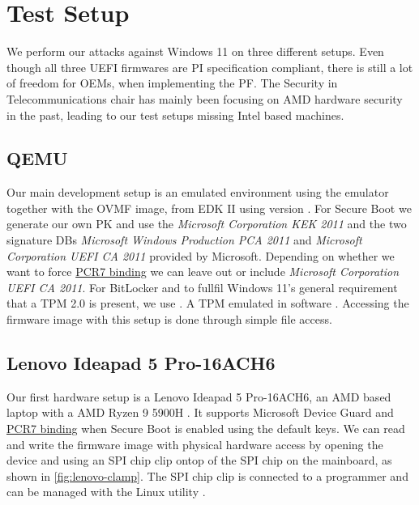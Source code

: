 
\chapter{Test Setup}
\label{sec:test-setup}

We perform our attacks against Windows 11 on three different setups.
Even though all three \ac{UEFI} firmwares are \ac{PI} specification compliant, there is still a lot of freedom for \acp{OEM}, when implementing the \ac{PF}.
The Security in Telecommunications chair has mainly been focusing on \ac{AMD} hardware security in the past, leading to our test setups missing Intel based machines.

\section{\acs{QEMU}}
\label{sec:test-setup:qemu}

Our main development setup is an emulated environment using the emulator  \cite{qemu} together with the \ac{OVMF} image, from \ac{EDK} II using version .
For Secure Boot we generate our own \ac{PK} and use the \emph{Microsoft Corporation \acs{KEK}  2011} and the two signature \acp{DB} \emph{Microsoft Windows Production PCA 2011} and \emph{Microsoft Corporation UEFI CA 2011} provided by Microsoft.
Depending on whether we want to force \hyperlink{pcr7-binding}{\ac{PCR}7 binding} we can leave out or include \emph{Microsoft Corporation UEFI CA 2011}.
For BitLocker and to fullfil Windows 11's general requirement that a \ac{TPM} 2.0 is present, we use .
A \ac{TPM} emulated in software \cite{swtpm}.
Accessing the firmware image with this setup is done through simple file access.

\section{Lenovo Ideapad 5 Pro-16ACH6}
\label{sec:test-setup:lenovo}

Our first hardware setup is a Lenovo Ideapad 5 Pro-16ACH6, an \ac{AMD} based laptop with a \ac{AMD} Ryzen 9 5900H \cite{lenovo-ideapad}.
It supports Microsoft Device Guard and \hyperlink{pcr7-binding}{\ac{PCR}7 binding} when Secure Boot is enabled using the default keys.
We can read and write the firmware image with physical hardware access by opening the device and using an \ac{SPI} chip clip ontop of the \ac{SPI} chip on the mainboard, as shown in \autoref{fig:lenovo-clamp}.
The \ac{SPI} chip clip is connected to a programmer and can be managed with the Linux utility .

